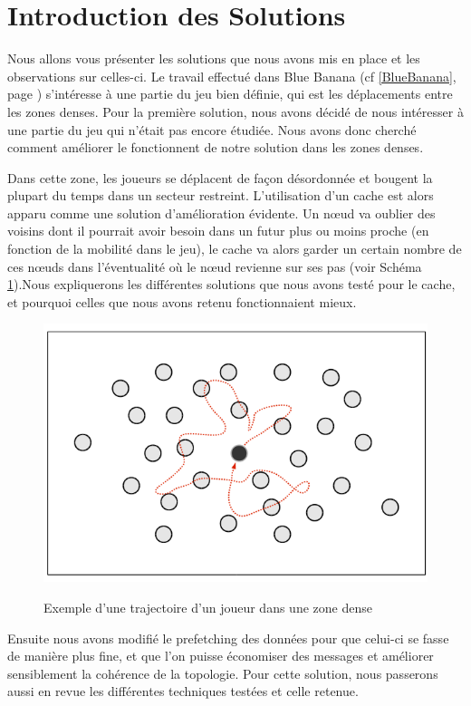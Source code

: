 \section{Introduction des Solutions}
\label{introSolutions}
	Nous allons vous présenter les solutions que nous avons mis en place et les observations sur celles-ci. Le travail effectué dans Blue Banana (cf \ref{BlueBanana}, page \pageref{BlueBanana}) s'intéresse à une partie du jeu bien définie, qui est les déplacements entre les zones denses. Pour la première solution, nous avons décidé de nous intéresser à une partie du jeu qui n'était pas encore étudiée. Nous avons donc cherché comment améliorer le fonctionnent de notre solution dans les zones denses. 
\par Dans cette zone, les joueurs se déplacent de façon désordonnée et bougent la plupart du temps dans un secteur restreint. L'utilisation d'un cache est alors apparu comme une solution d'amélioration évidente. Un nœud va oublier des voisins dont il pourrait avoir besoin dans un futur plus ou moins proche (en fonction de la mobilité dans le jeu), le cache va alors garder un certain nombre de ces nœuds dans l'éventualité où le nœud revienne sur ses pas (voir Schéma \ref{mouveDense}).Nous expliquerons les différentes solutions que nous avons testé pour le cache, et pourquoi celles que nous avons retenu fonctionnaient mieux.
	\vspace{5mm}
        \begin{figure}[!h]
        \centering
        \includegraphics[scale=0.45]{./Ressources/Images/mouvementsZoneDense.png}\\
        \caption{Exemple d'une trajectoire d'un joueur dans une zone dense}
        \label{mouveDense}
        \end{figure}
\par Ensuite nous avons modifié le prefetching des données pour que celui-ci se fasse de manière plus fine, et que l'on puisse économiser des messages et améliorer sensiblement la cohérence de la topologie. Pour cette solution, nous passerons aussi en revue les différentes techniques testées et celle retenue.



